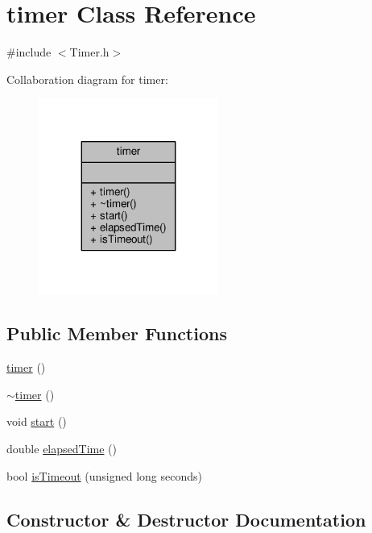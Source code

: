 \hypertarget{classtimer}{}\section{timer Class Reference}
\label{classtimer}


{\ttfamily \#include $<$Timer.\+h$>$}



Collaboration diagram for timer\+:
\nopagebreak
\begin{figure}[H]
\begin{center}
\leavevmode
\includegraphics[width=167pt]{classtimer__coll__graph}
\end{center}
\end{figure}
\subsection*{Public Member Functions}
\begin{DoxyCompactItemize}
\item 
\hyperlink{classtimer_ae536faf93e02933cd025a6fbcbb48d0a}{timer} ()
\item 
\hyperlink{classtimer_aee05958ea6b0fbf36ea1fd22747cd546}{$\sim$timer} ()
\item 
void \hyperlink{classtimer_a9aa894a57748b2bdf3adce46f5736794}{start} ()
\item 
double \hyperlink{classtimer_ad24294c856c6962200880fb1eeb09cc4}{elapsed\+Time} ()
\item 
bool \hyperlink{classtimer_a884fa19b64e312656f79aeecdfb5fb62}{is\+Timeout} (unsigned long seconds)
\end{DoxyCompactItemize}


\subsection{Constructor \& Destructor Documentation}
\hypertarget{classtimer_ae536faf93e02933cd025a6fbcbb48d0a}{}\label{classtimer_ae536faf93e02933cd025a6fbcbb48d0a} 
